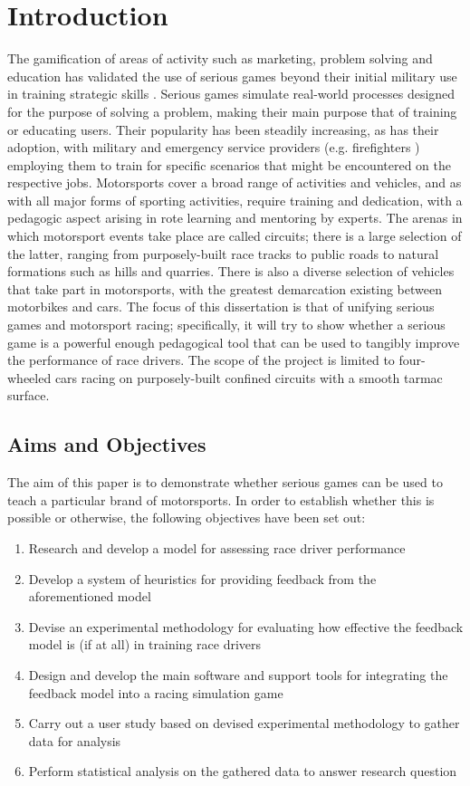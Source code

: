 \documentclass{sig-alternate}
\begin{document}
\section{Introduction}
The gamification of areas of activity such as marketing, problem solving and education \cite{michael2005serious} has validated the use of serious games beyond their initial military use in training strategic skills \cite{djaouti2011classifying}.  Serious games simulate real-world processes designed for the purpose of solving a problem, making their main purpose that of training or educating users. Their popularity has been steadily increasing, as has their adoption, with military \cite{djaouti2011classifying} and emergency service providers (e.g. firefighters \cite{michael2005serious}) employing them to train for specific scenarios that might be encountered on the respective jobs. Motorsports cover a broad range of activities and vehicles, and as with all major forms of sporting activities, require training and dedication, with a pedagogic aspect arising in rote learning and mentoring by experts. The arenas in which motorsport events take place are called circuits; there is a large selection of the latter, ranging from purposely-built race tracks to public roads to natural formations such as hills and quarries. There is also a diverse selection of vehicles that take part in motorsports, with the greatest demarcation existing between motorbikes and cars. The focus of this dissertation is that of unifying serious games and motorsport racing; specifically, it will try to show whether a serious game is a powerful enough pedagogical tool that can be used to tangibly improve the performance of race drivers. The scope of the project is limited to four-wheeled cars racing on purposely-built confined circuits with a smooth tarmac surface.

\subsection{Aims and Objectives}
The aim of this paper is to demonstrate whether serious games can be used to teach a particular brand of motorsports. In order to establish whether this is possible or otherwise, the following objectives have been set out:

\begin{enumerate}
	\item Research and develop a model for assessing race driver performance
	\item Develop a system of heuristics for providing feedback from the aforementioned model
	\item Devise an experimental methodology for evaluating how effective the feedback model is (if at all) in training race drivers
	\item Design and develop the main software and support tools for integrating the feedback model into a racing simulation game
	\item Carry out a user study based on devised experimental methodology to gather data for analysis
	\item Perform statistical analysis on the gathered data to answer research question
\end{enumerate}
\end{document}
